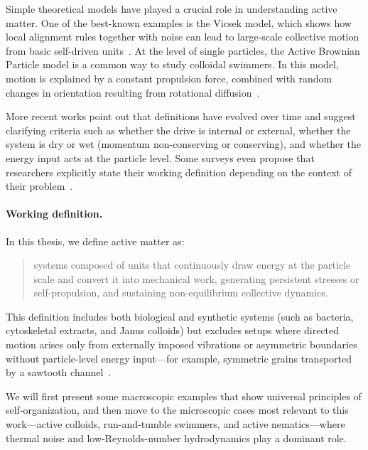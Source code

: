 Simple theoretical models have played a crucial role in understanding active matter. One of the best-known examples is the Vicsek model, which shows how local alignment rules together with noise can lead to large-scale collective motion from basic self-driven units~\cite{vicsek1995novel, chate2008collective}. At the level of single particles, the Active Brownian Particle model is a common way to study colloidal swimmers. In this model, motion is explained by a constant propulsion force, combined with random changes in orientation resulting from rotational diffusion~\cite{romanczuk2012active, elgeti2015physics}.


More recent works point out that definitions have evolved over time and suggest clarifying criteria such as whether the drive is internal or external, whether the system is dry or wet (momentum non-conserving or conserving), and whether the energy input acts at the particle level. Some surveys even propose that researchers explicitly state their working definition depending on the context of their problem~\cite{gompper20202020, gompper20252025}.

\paragraph{Working definition.} In this thesis, we define active matter as:
\begin{quote}
systems composed of units that continuously draw energy at the particle scale and convert it into mechanical work, generating persistent stresses or self-propulsion, and sustaining non-equilibrium collective dynamics.
\end{quote}

This definition includes both biological and synthetic systems (such as bacteria, cytoskeletal extracts, and Janus colloids) but excludes setups where directed motion arises only from externally imposed vibrations or asymmetric boundaries without particle-level energy input—for example, symmetric grains transported by a sawtooth channel~\cite{reimann2002brownian, hanggi2009artificial}.



We will first present some macroscopic examples that show universal principles of self-organization, and then move to the microscopic cases most relevant to this work—active colloids, run-and-tumble swimmers, and active nematics—where thermal noise and low-Reynolds-number hydrodynamics play a dominant role.


